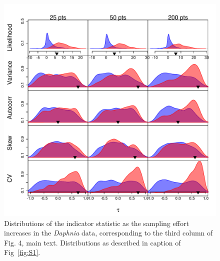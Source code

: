 \documentclass[11pt]{elsarticle}
\begin{document}
\begin{figure}[ht]
  \begin{center}
    \includegraphics{FigS4.pdf}
  \end{center}
  \caption{Distributions of the indicator statistic as the sampling effort increases in the \emph{Daphnia} data, corresponding to the third column of Fig. 4, main text.  Distributions as described in caption of Fig~\ref{fig:S1}.}
  \label{fig:S4}
\end{figure}
\end{document}
